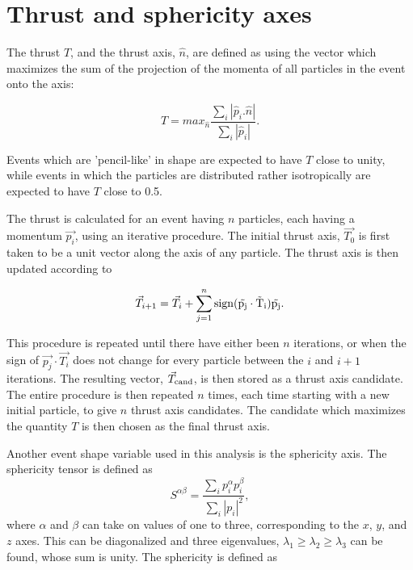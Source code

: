 \section{Thrust and sphericity axes}

The thrust $T$, and the thrust axis, $\hat{n}$, are defined as using the vector which maximizes the sum of the projection of the momenta of all particles in the event onto the axis:

\begin{equation}
T = max_{\hat{n}} \frac {\sum_i \left| \hat{p}_i . \hat{n} \right|}{\sum_i \left| \hat{p}_i \right|}.
\end{equation}

Events which are 'pencil-like' in shape are expected to have $T$ close to unity, while events in which the particles are distributed rather isotropically are expected to have $T$ close to 0.5.  

The thrust is calculated for an event having $n$ particles, each having a momentum $\vec{p_{i}}$, using an iterative procedure. The initial thrust axis, $\vec{T_0}$ is first taken to be a unit vector along the axis of any particle.  The thrust axis is then updated according to

\begin{equation}
\vec{T}_{i+1} = \vec{T}_{i}+\sum\limits_{j=1}^n  \rm{sign}(\vec{p_j}\cdot\vec{T}_i)\vec{p_{j}}.
\end{equation}

This procedure is repeated until there have either been $n$ iterations, or when the sign of $\vec{p_j}\cdot\vec{T_i}$ does not change for every particle between the $i$ and $i+1$ iterations.  The resulting vector, $\vec{T}_{\rm{cand}}$, is then stored as a thrust axis candidate.  The entire procedure is then repeated $n$ times, each time starting with a new initial particle, to give $n$ thrust axis candidates.  The candidate which maximizes the quantity $T$ is then chosen as the final thrust axis.

Another event shape variable used in this analysis is the sphericity axis.  The sphericity tensor is defined as
\begin{equation}
S^{\alpha\beta}=\frac{\sum\limits_{i}p_{i}^{\alpha}p_{i}^{\beta}}{\sum\limits_{i}|p_{i}|^2},
\end{equation}
where $\alpha$ and $\beta$ can take on values of one to three, corresponding to the $x$, $y$, and $z$ axes.  This can be diagonalized and three eigenvalues, $\lambda_{1}\geq\lambda_{2}\geq\lambda_{3}$ can be found, whose sum is unity.  The sphericity is defined as

